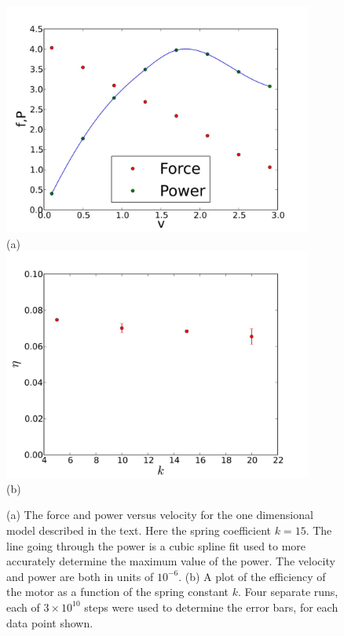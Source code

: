 \documentclass[11pt]{ucthesis}
\begin{document}
\begin{figure}[htp]
\begin{center}
\includegraphics[width=4in]{fvsv.k15}\\
(a)\\
\includegraphics[width=4in]{maxpower}\\
(b)
\caption{
(a) The force and power versus velocity for the one dimensional model described
in the text. Here the spring coefficient $k=15$. The line going through the
power is a cubic spline fit used to more accurately determine the maximum value
of the power. The velocity and power are both in units of $10^{-6}$.
(b) A plot of the efficiency of the motor as a function of the spring constant
$k$. Four separate runs, each of $3\times 10^{10}$ steps were used to determine
the error bars, for each data point shown.
}
\label{fig:1dfvsv}
\end{center}
\end{figure}
\end{document}

